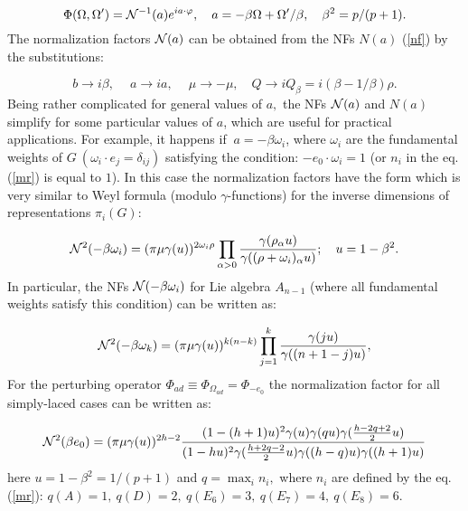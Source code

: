 \documentclass[a4paper,12pt]{article}
\begin{document}
\begin{equation}
\Phi (\Omega ,\Omega ^{\prime })={\cal N}^{-1}(a)e^{ia\cdot \varphi },\quad
a=-\beta \Omega +\Omega ^{\prime }/\beta ,\quad \beta ^2=p/(p+1).
\label{repr}
\end{equation}
The normalization factors ${\cal N}(a)$ can be obtained from the NFs $N(a)$  
(\ref{nf}) by the substitutions:

\begin{equation}
b\rightarrow i\beta ,\quad \ a\rightarrow ia,\quad \ \mu \rightarrow -\mu
,\quad Q\rightarrow iQ_\beta =i(\beta -1/\beta )\rho .  \label{sbs}
\end{equation}
Being rather complicated for general values of $a,$ the NFs ${\cal N}(a)$
and $N(a)$ simplify for some particular values of $a$, which are useful for
practical applications. For example, it happens if $\ a=-\beta \omega _i$,
where $\omega _i$ are the fundamental weights of $G\ (\omega _i\cdot
e_j=\delta _{ij})$ satisfying the condition: $-e_0\cdot \omega _i=1$ (or $
n_i $ in the eq.(\ref{mr}) is equal to $1$). In this case the 
normalization factors have the
form which is very similar to Weyl formula (modulo $\gamma $-functions) for
the inverse dimensions of representations $\pi _i(G)$:

\begin{equation}
{\cal N}^2(-\beta \omega _i)=(\pi \mu \gamma (u))^{2\omega _i\rho
}\prod_{\alpha >0}\frac{\gamma (\rho _\alpha u)}{\gamma ((\rho +\omega
_i)_\alpha u)};\quad u=1-\beta ^2.  \label{gd}
\end{equation}
In particular, the NFs ${\cal N}(-\beta \omega _i)$ for Lie algebra $A_{n-1}$
(where all fundamental weights satisfy this condition) can be written as:

\begin{equation}
{\cal N}^2(-\beta \omega _k)=(\pi \mu \gamma (u))^{k(n-k)}\prod_{j=1}^k\frac{
\gamma (ju)}{\gamma ((n+1-j)u)},  \label{an}
\end{equation}
For the perturbing operator $\Phi _{ad}\equiv \Phi _{\Omega _{ad}}=\Phi
_{-e_0}$ the normalization factor for all simply-laced cases can be written
as:

\begin{displaymath}
{\cal N}^2(\beta e_0)=(\pi \mu \gamma (u))^{2h-2}\frac{(1-(h+1)u)^2\gamma
(u)\gamma (qu)\gamma (\frac{h-2q+2}2u)}{(1-hu)^2\gamma (\frac{h+2q-2}{2}u)
\gamma ((h-q)u)\gamma ((h+1)u)}  
\end{displaymath}
here $u=1-\beta ^2=1/(p+1)$ and $q=\max_in_i,$ where $n_i$ are defined by
the eq.(\ref{mr}): $q(A)=1,\ q(D)=2,\ q(E_6)=3,\ q(E_7)=4,\ q(E_8)=6.$
\end{document}
